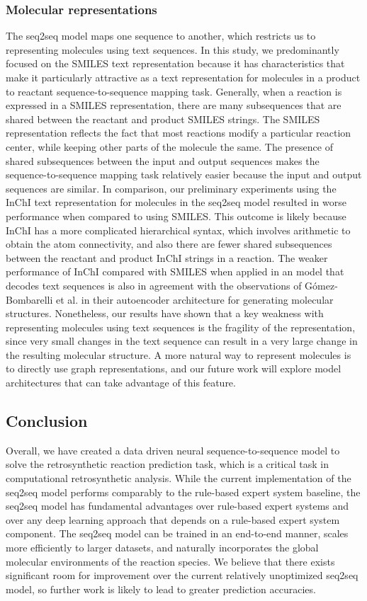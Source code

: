 \subsubsection{Molecular representations}

The seq2seq model maps one sequence to another, which restricts us to representing molecules using text sequences. In this study, we predominantly focused on the SMILES text representation because it has characteristics that make it particularly attractive as a text representation for molecules in a product to reactant sequence-to-sequence mapping task. Generally, when a reaction is expressed in a SMILES representation, there are many subsequences that are shared between the reactant and product SMILES strings. The SMILES representation reflects the fact that most reactions modify a particular reaction center, while keeping other parts of the molecule the same. The presence of shared subsequences between the input and output sequences makes the sequence-to-sequence mapping task relatively easier because the input and output sequences are similar. In comparison, our preliminary experiments using the InChI text representation for molecules in the seq2seq model resulted in worse performance when compared to using SMILES. This outcome is likely because InChI has a more complicated hierarchical syntax, which involves arithmetic to obtain the atom connectivity, and also there are fewer shared subsequences between the reactant and product InChI strings in a reaction. The weaker performance of InChI compared with SMILES when applied in an model that decodes text sequences is also in agreement with the observations of Gómez-Bombarelli et al. \cite{gomez2016automatic}  in their autoencoder architecture for generating molecular structures. Nonetheless, our results have shown that a key weakness with representing molecules using text sequences is the fragility of the representation, since very small changes in the text sequence can result in a very large change in the resulting molecular structure. A more natural way to represent molecules is to directly use graph representations, and our future work will explore model architectures that can take advantage of this feature.

\subsection{Conclusion}

Overall, we have created a data driven neural sequence-to-sequence model to solve the retrosynthetic reaction prediction task, which is a critical task in computational retrosynthetic analysis. While the current implementation of the seq2seq model performs comparably to the rule-based expert system baseline, the seq2seq model has fundamental advantages over rule-based expert systems and over any deep learning approach that depends on a rule-based expert system component. The seq2seq model can be trained in an end-to-end manner, scales more efficiently to larger datasets, and naturally incorporates the global molecular environments of the reaction species. We believe that there exists significant room for improvement over the current relatively unoptimized seq2seq model, so further work is likely to lead to greater prediction accuracies. 

